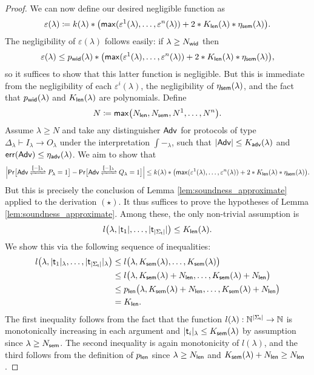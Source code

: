 \begin{proof}
\noindent We can now define our desired negligible function as
\[\varepsilon(\lambda) \coloneqq k(\lambda) * \big(\mathsf{max}(\varepsilon^1(\lambda),\ldots,\varepsilon^n(\lambda)) + 2 * K_{\mathsf{len}}(\lambda) * \eta_{\mathsf{sem}}(\lambda)\big).\]
The negligibility of $\varepsilon(\lambda)$ follows easily: if $\lambda \geq N_{\mathsf{wid}}$ then
\[\varepsilon(\lambda) \leq p_{\mathsf{wid}}(\lambda) * \big(\mathsf{max}(\varepsilon^1(\lambda),\ldots,\varepsilon^n(\lambda)) + 2 * K_{\mathsf{len}}(\lambda) * \eta_{\mathsf{sem}}(\lambda)\big),\]
so it suffices to show that this latter function is negligible. But this is immediate from the negligibility of each $\varepsilon^i(\lambda)$, the negligibility of $\eta_{\mathsf{sem}}(\lambda)$, and the fact that $p_{\mathsf{wid}}(\lambda)$ and $K_{\mathsf{len}}(\lambda)$ are polynomials. Define
\[N \coloneqq \mathsf{max}\big(N_{\mathsf{len}},N_{\mathsf{sem}},N^1,\ldots,N^n\big).\]
Assume $\lambda \geq N$ and take any distinguisher $\mathsf{Adv}$ for protocols of type $\Delta_\lambda \vdash I_\lambda \to O_\lambda$ under the interpretation $\int{-}_\lambda$, such that $|\mathsf{Adv}| \leq K_{\mathsf{adv}}(\lambda)$ and $\mathsf{err}(\mathsf{Adv}) \leq \eta_{\mathsf{adv}}(\lambda)$. We aim to show that
\[\Big|\mathsf{Pr}\big[\interaction{\Adv}{P_\lambda}{\int{-}_\lambda} = 1\big] - \mathsf{Pr}\big[\interaction{\Adv}{Q_\lambda}{\int{-}_\lambda} = 1\big]\Big| \leq k(\lambda) * \big(\max(\varepsilon^1(\lambda),\ldots,\varepsilon^n(\lambda)) + 2 * K_\length(\lambda) * \eta_\sem(\lambda)\big).\]
But this is precisely the conclusion of Lemma \ref{lem:soundness_approximate} applied to the derivation $(\star)$. It thus suffices to prove the hypotheses of Lemma \ref{lem:soundness_approximate}. Among these, the only non-trivial assumption is
\[l\big(\lambda,|\mathsf{t}_1|,\ldots,|\mathsf{t}_{|\Sigma_\mathsf{t}|}|\big) \leq K_{\mathsf{len}}(\lambda).\]
We show this via the following sequence of inequalities:
\begin{align*}
l\big(\lambda,|\mathsf{t}_1|_\lambda,\ldots,|\mathsf{t}_{|\Sigma_\mathsf{t}|}|_\lambda\big) & \leq
l\big(\lambda,K_{\mathsf{sem}}(\lambda),\ldots,K_{\mathsf{sem}}(\lambda)\big) \\ & \leq
l\big(\lambda,K_{\mathsf{sem}}(\lambda) + N_{\mathsf{len}},\ldots,K_{\mathsf{sem}}(\lambda) + N_{\mathsf{len}}\big) \\ & \leq
p_{\mathsf{len}}\big(\lambda,K_{\mathsf{sem}}(\lambda) + N_{\mathsf{len}},\ldots,K_{\mathsf{sem}}(\lambda) + N_{\mathsf{len}}\big) \\ & = K_{\mathsf{len}}.
\end{align*}
The first inequality follows from the fact that the function $l(\lambda) : \mathbb{N}^{|\Sigma_{\mathsf{t}}|} \to \mathbb{N}$ is monotonically increasing in each argument and $|\mathsf{t}_i|_\lambda \leq K_{\mathsf{sem}}(\lambda)$ by assumption since $\lambda \geq N_{\mathsf{sem}}$. The second inequality is again monotonicity of $l(\lambda)$, and the third follows from the definition of $p_{\mathsf{len}}$ since $\lambda \geq N_{\mathsf{len}}$ and $K_{\mathsf{sem}}(\lambda) + N_{\mathsf{len}} \geq N_{\mathsf{len}}$.
\end{proof}

